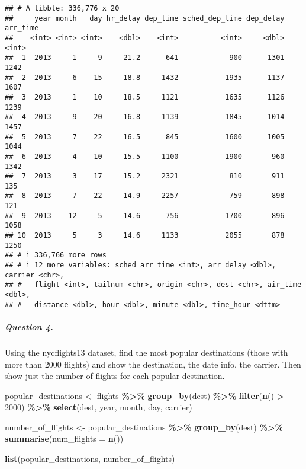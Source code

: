 \documentclass[
]{article}
\newenvironment{Shaded}{\begin{snugshade}}{\end{snugshade}}
\newcommand{\AttributeTok}[1]{\textcolor[rgb]{0.13,0.29,0.53}{#1}}
\newcommand{\DecValTok}[1]{\textcolor[rgb]{0.00,0.00,0.81}{#1}}
\newcommand{\FunctionTok}[1]{\textcolor[rgb]{0.13,0.29,0.53}{\textbf{#1}}}
\newcommand{\NormalTok}[1]{#1}
\newcommand{\OtherTok}[1]{\textcolor[rgb]{0.56,0.35,0.01}{#1}}
\newcommand{\SpecialCharTok}[1]{\textcolor[rgb]{0.81,0.36,0.00}{\textbf{#1}}}
\begin{document}
\begin{verbatim}
## # A tibble: 336,776 x 20
##     year month   day hr_delay dep_time sched_dep_time dep_delay arr_time
##    <int> <int> <int>    <dbl>    <int>          <int>     <dbl>    <int>
##  1  2013     1     9     21.2      641            900      1301     1242
##  2  2013     6    15     18.8     1432           1935      1137     1607
##  3  2013     1    10     18.5     1121           1635      1126     1239
##  4  2013     9    20     16.8     1139           1845      1014     1457
##  5  2013     7    22     16.5      845           1600      1005     1044
##  6  2013     4    10     15.5     1100           1900       960     1342
##  7  2013     3    17     15.2     2321            810       911      135
##  8  2013     7    22     14.9     2257            759       898      121
##  9  2013    12     5     14.6      756           1700       896     1058
## 10  2013     5     3     14.6     1133           2055       878     1250
## # i 336,766 more rows
## # i 12 more variables: sched_arr_time <int>, arr_delay <dbl>, carrier <chr>,
## #   flight <int>, tailnum <chr>, origin <chr>, dest <chr>, air_time <dbl>,
## #   distance <dbl>, hour <dbl>, minute <dbl>, time_hour <dttm>
\end{verbatim}

\hypertarget{question-4.}{%
\subparagraph{Question 4.}\label{question-4.}}

Using the nycflights13 dataset, find the most popular destinations
(those with more than 2000 flights) and show the destination, the date
info, the carrier. Then show just the number of flights for each popular
destination.

\begin{Shaded}
\begin{Highlighting}[]
\NormalTok{popular\_destinations }\OtherTok{\textless{}{-}}\NormalTok{ flights }\SpecialCharTok{\%\textgreater{}\%}
  \FunctionTok{group\_by}\NormalTok{(dest) }\SpecialCharTok{\%\textgreater{}\%}
  \FunctionTok{filter}\NormalTok{(}\FunctionTok{n}\NormalTok{() }\SpecialCharTok{\textgreater{}} \DecValTok{2000}\NormalTok{) }\SpecialCharTok{\%\textgreater{}\%}
  \FunctionTok{select}\NormalTok{(dest, year, month, day, carrier)}

\NormalTok{number\_of\_flights }\OtherTok{\textless{}{-}}\NormalTok{ popular\_destinations }\SpecialCharTok{\%\textgreater{}\%}
  \FunctionTok{group\_by}\NormalTok{(dest) }\SpecialCharTok{\%\textgreater{}\%}
  \FunctionTok{summarise}\NormalTok{(}\AttributeTok{num\_flights =} \FunctionTok{n}\NormalTok{())}

\FunctionTok{list}\NormalTok{(popular\_destinations, number\_of\_flights)}
\end{Highlighting}
\end{Shaded}
\end{document}
